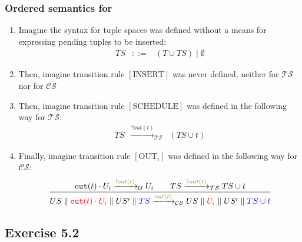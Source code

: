 \documentclass[presentation]{beamer}\mode<presentation>{\usetheme{AMSCesenaPurpleAndGold}}
\begin{document}
\begin{frame}
\frametitle{Ordered semantics for \linda{}}

    \begin{enumerate}
        \item<1> Imagine the syntax for tuple spaces was defined without a means for expressing pending tuples to be inserted:
        \[\begin{array}{rcl}
            TS &::=& (T \cup TS) \mid \emptyset
        \end{array}\]
        
        \vfill
        
        \item<2> Then, imagine transition rule $[\text{INSERT}]$ was never defined, neither for $\mathcal{TS}$ nor for $\mathcal{CS}$
        
        \vfill
        
        \item<3> Then, imagine transition rule $[\text{SCHEDULE}]$ was defined in the following way for $\mathcal{TS}$:
        \[\begin{array}{rcl}
            TS &\xrightarrow{?out(t)}_\mathcal{TS}& (TS \cup t)
        \end{array}\]
        
        \vfill
        
        \item<4> Finally, imagine transition rule $[\text{OUT}_i]$ was defined in the following way for $\mathcal{CS}$:
        \[
            \frac{
                \mathtt{out}(t) \cdot U_i \xrightarrow{\highlightG{!out(t)}}_\mathcal{U} U_i 
                \qquad
                TS \xrightarrow{\highlightG{?out(t)}}_\mathcal{TS} TS \cup t 
            }{
                US \parallel \highlightR{\mathtt{out}(t) \cdot U_i} \parallel US' \parallel \highlightB{TS}
                \xrightarrow{\highlightG{out(t)}}_\mathcal{CS}
                US \parallel \highlightR{U_i} \parallel US' \parallel \highlightB{TS \cup t }
            }
        \]
    \end{enumerate}

\end{frame}

\subsection{Exercise 5.2}
\end{document}
